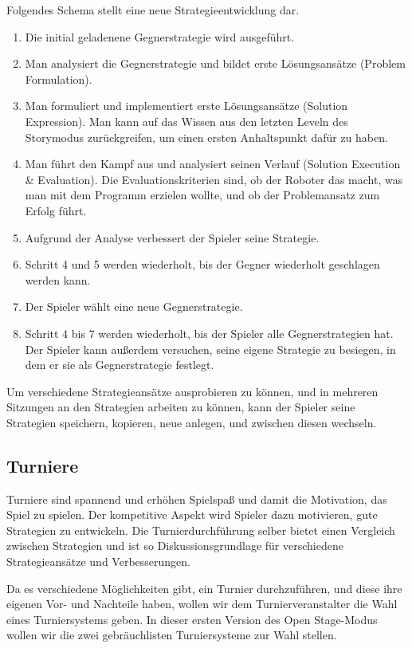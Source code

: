 Folgendes Schema stellt eine neue Strategieentwicklung dar.

\begin{enumerate}
\item Die initial geladenene Gegnerstrategie wird ausgeführt.
\item Man analysiert die Gegnerstrategie und bildet erste Lösungsansätze (Problem Formulation).
\item Man formuliert und implementiert erste Lösungsansätze (Solution Expression). Man kann auf das Wissen aus den letzten
Leveln des Storymodus zurückgreifen, um einen ersten Anhaltspunkt dafür zu haben.
\item Man führt den Kampf aus und analysiert seinen Verlauf (Solution Execution \& Evaluation). Die Evaluationskriterien sind, ob der Roboter
das macht, was man mit dem Programm erzielen wollte, und ob der Problemansatz zum Erfolg führt.
\item Aufgrund der Analyse verbessert der Spieler seine Strategie.
\item Schritt 4 und 5 werden wiederholt, bis der Gegner wiederholt geschlagen werden kann.
\item Der Spieler wählt eine neue Gegnerstrategie.
\item Schritt 4 bis 7 werden wiederholt, bis der Spieler alle Gegnerstrategien hat. Der Spieler kann außerdem
versuchen, seine eigene Strategie zu besiegen, in dem er sie als Gegnerstrategie festlegt.
\end{enumerate}

Um verschiedene Strategieansätze ausprobieren zu können, und in mehreren Sitzungen an den Strategien
arbeiten zu können, kann der Spieler seine Strategien speichern, kopieren, neue anlegen, und
zwischen diesen wechseln.


\subsection{Turniere}

Turniere sind spannend und erhöhen Spielspaß und damit die Motivation, das Spiel zu spielen. Der
kompetitive Aspekt wird Spieler dazu motivieren, gute Strategien zu entwickeln. Die
Turnierdurchführung selber bietet einen Vergleich zwischen Strategien und ist so
Diskussionsgrundlage für verschiedene Strategieansätze und Verbesserungen.

Da es verschiedene Möglichkeiten gibt, ein Turnier durchzuführen, und diese ihre eigenen Vor- und
Nachteile haben, wollen wir dem Turnierveranstalter die Wahl eines Turniersystems geben. In dieser
ersten Version des Open Stage-Modus wollen wir die zwei gebräuchlisten Turniersysteme zur Wahl
stellen.

